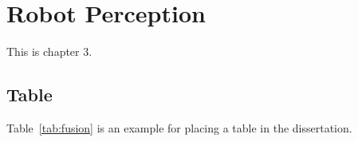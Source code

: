 \chapter{Robot Perception}
\pagestyle{plain}

This is chapter 3. 

\section{Table}
Table~\ref{tab:fusion} is an example \cite{xie2023drl, xie2021towards} for placing a table in the dissertation.

\begin{table}[t]
    \centering
    \caption{Ablation experiment results with different fusion structures}
    \label{tab:fusion}
\end{table}


